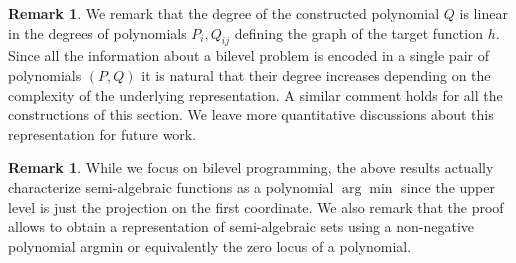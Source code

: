 \documentclass{article}
\newcommand*{\cP}{\mathcal{P}}
\newcommand*{\cY}{\mathcal{Y}}
\newcommand*{\RR}{\mathbb{R}}
\newcommand{\graph}{\mathrm{graph}\ }
\newcommand{\argmin}{\arg\min}
\newcommand{\SA}{\mathcal{SA}}
\newcommand{\bounded}{\text{bounded}}
\newcommand{\optim}{\text{optim}}
\newcommand{\pessim}{\text{pessim}}
\newcommand{\TL}[1]{\textcolor{red}{#1}}
\theoremstyle{plain}
\theoremstyle{definition}
\newtheorem{remark}[theorem]{Remark}
\begin{document}
{
\begin{remark}
    We remark that the degree of the constructed polynomial $Q$ is linear in the degrees of polynomials $P_i,Q_{ij}$ defining the graph of the target function $h$. Since all the information about a bilevel problem is encoded in a single pair of polynomials $(P,Q)$ it is natural that their degree increases depending on the complexity of the underlying representation. A similar comment holds for all the constructions of this section. We leave more quantitative discussions about this representation for future work.
\end{remark}
}
{
\begin{remark}
    While we focus on bilevel programming, the above results actually characterize semi-algebraic functions as a polynomial $\argmin$ since the upper level is just the projection on the first coordinate. We also remark that the proof allows to obtain a representation of semi-algebraic sets using a non-negative polynomial argmin or equivalently the zero locus of a polynomial.
\end{remark}
}

\end{document}
